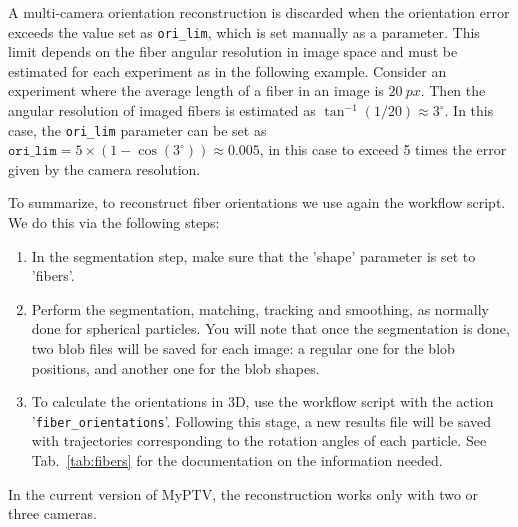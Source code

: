 \documentclass[10pt,a4paper]{article}
\begin{document}
A multi-camera orientation reconstruction is discarded when the orientation error exceeds the value set as \texttt{ori\_lim}, which is set manually as a parameter. This limit depends on the fiber angular resolution in image space and must be estimated for each experiment as in the following example. Consider an experiment where the average length of a fiber in an image is $20 \ px$. Then the angular resolution of imaged fibers is estimated as $\tan^{-1}(1/20)\approx 3^{\circ}$. In this case, the \texttt{ori\_lim} parameter can be set as $\texttt{ori\_lim} = 5 \times (1 - \cos(3^{\circ})) \approx 0.005$, in this case to exceed 5 times the error given by the camera resolution.


To summarize, to reconstruct fiber orientations we use again the workflow script. We do this via the following steps:

\begin{enumerate}
	
	\item In the segmentation step, make sure that the 
	'shape' parameter is set to 'fibers'.
	
	\item Perform the segmentation, matching, tracking and smoothing, as normally done for spherical particles. You will note that once the segmentation is done, two blob files will be saved for each image: a regular one for the blob positions, and another one for the blob shapes. 
	
	\item To calculate the orientations in 3D, use the workflow script with the action '\texttt{fiber\_orientations}'. Following this stage, a new results file will be saved with trajectories corresponding to the rotation angles of each particle. See Tab.~\ref{tab:fibers} for the documentation on the information needed. 
	
\end{enumerate}  

In the current version of MyPTV, the reconstruction works only with two or three cameras.
\end{document}
